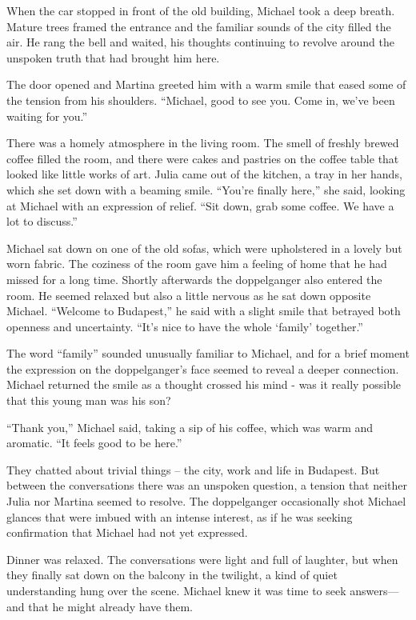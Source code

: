 \documentclass[
]{article}
\begin{document}
When the car stopped in front of the old building, Michael took a deep
breath. Mature trees framed the entrance and the familiar sounds of the
city filled the air. He rang the bell and waited, his thoughts
continuing to revolve around the unspoken truth that had brought him
here.

The door opened and Martina greeted him with a warm smile that eased
some of the tension from his shoulders. ``Michael, good to see you. Come
in, we've been waiting for you.''

There was a homely atmosphere in the living room. The smell of freshly
brewed coffee filled the room, and there were cakes and pastries on the
coffee table that looked like little works of art. Julia came out of the
kitchen, a tray in her hands, which she set down with a beaming smile.
``You're finally here,'' she said, looking at Michael with an expression
of relief. ``Sit down, grab some coffee. We have a lot to discuss.''

Michael sat down on one of the old sofas, which were upholstered in a
lovely but worn fabric. The coziness of the room gave him a feeling of
home that he had missed for a long time. Shortly afterwards the
doppelganger also entered the room. He seemed relaxed but also a little
nervous as he sat down opposite Michael. ``Welcome to Budapest,'' he
said with a slight smile that betrayed both openness and uncertainty.
``It's nice to have the whole `family' together.''

The word ``family'' sounded unusually familiar to Michael, and for a
brief moment the expression on the doppelganger's face seemed to reveal
a deeper connection. Michael returned the smile as a thought crossed his
mind - was it really possible that this young man was his son?

``Thank you,'' Michael said, taking a sip of his coffee, which was warm
and aromatic. ``It feels good to be here.''

They chatted about trivial things -- the city, work and life in
Budapest. But between the conversations there was an unspoken question,
a tension that neither Julia nor Martina seemed to resolve. The
doppelganger occasionally shot Michael glances that were imbued with an
intense interest, as if he was seeking confirmation that Michael had not
yet expressed.

Dinner was relaxed. The conversations were light and full of laughter,
but when they finally sat down on the balcony in the twilight, a kind of
quiet understanding hung over the scene. Michael knew it was time to
seek answers---and that he might already have them.
\end{document}
